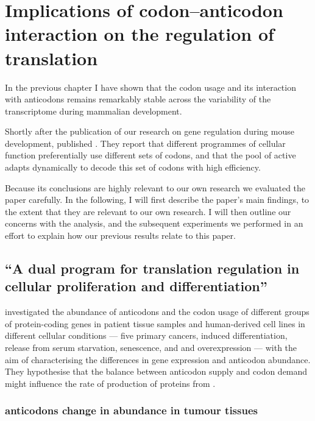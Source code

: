 \chapter{Implications of codon–anticodon interaction on the regulation of translation}

In the previous chapter I have shown that the codon usage and its interaction
with \trna anticodons remains remarkably stable across the variability of the
transcriptome during mammalian development.

Shortly after the publication of our research on \trna gene regulation during
mouse development, \citet{Gingold:2014} published . They
report that different programmes of cellular function preferentially use
different sets of codons, and that the pool of active \trna[s] adapts
dynamically to decode this set of codons with high efficiency.

Because its conclusions are highly relevant to our own research we evaluated the
paper carefully. In the following, I will first describe the paper’s main
findings, to the extent that they are relevant to our own research. I will then
outline our concerns with the analysis, and the subsequent experiments we
performed in an effort to explain how our previous results relate to this paper.

\section{“A dual program for translation regulation in cellular proliferation
and differentiation”}

\citet{Gingold:2014} investigated the abundance of \trna anticodons and the
codon usage of different groups of protein-coding genes in patient tissue
samples and human-derived cell lines in different cellular conditions --- five
primary cancers, induced differentiation, release from serum starvation,
senescence, and  and  overexpression --- with the aim of
characterising the differences in \trna gene expression and \trna anticodon
abundance. They hypothesise that the balance between \trna anticodon supply and
codon demand might influence the rate of production of proteins from \mrna
\citep{Gingold:2011}.

\subsection{ anticodons change in abundance in tumour tissues}

